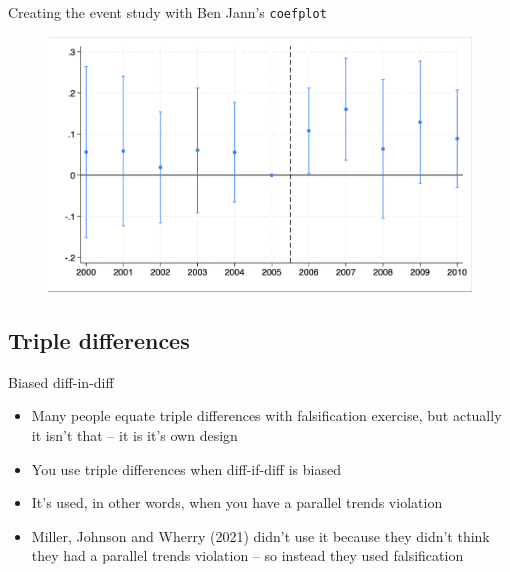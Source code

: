 \documentclass{beamer}
\begin{document}
\begin{frame}{Creating the event study with Ben Jann's \texttt{coefplot}}

	\begin{figure}
	\includegraphics[scale=0.20]{./lecture_includes/simple_eventstudy.png}
	\end{figure}

\end{frame}





\subsection{Triple differences}




\begin{frame}{Biased diff-in-diff}

\begin{itemize}

\item Many people equate triple differences with falsification exercise, but actually it isn't that -- it is it's own design
\item You use triple differences when diff-if-diff is biased
\item It's used, in other words, when you have a parallel trends violation
\item Miller, Johnson and Wherry (2021) didn't use it because they didn't think they had a parallel trends violation -- so instead they used falsification
\end{itemize}

\end{frame}
\end{document}
